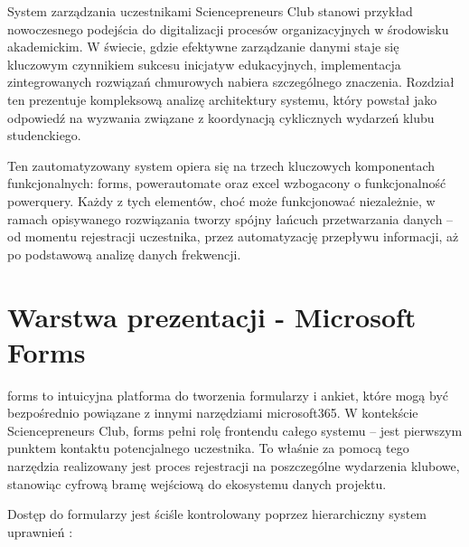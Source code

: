System zarządzania uczestnikami Sciencepreneurs Club stanowi przykład nowoczesnego podejścia do digitalizacji procesów organizacyjnych w środowisku akademickim. W świecie, gdzie efektywne zarządzanie danymi staje się kluczowym czynnikiem sukcesu inicjatyw edukacyjnych, implementacja zintegrowanych rozwiązań chmurowych nabiera szczególnego znaczenia. Rozdział ten prezentuje kompleksową analizę architektury systemu, który powstał jako odpowiedź na wyzwania związane z koordynacją cyklicznych wydarzeń klubu studenckiego.

Ten zautomatyzowany system opiera się na trzech kluczowych komponentach funkcjonalnych: \gls{forms}, \gls{powerautomate} oraz \gls{excel} wzbogacony o funkcjonalność \gls{powerquery}. Każdy z tych elementów, choć może funkcjonować niezależnie, w ramach opisywanego rozwiązania tworzy spójny łańcuch przetwarzania danych – od momentu rejestracji uczestnika, przez automatyzację przepływu informacji, aż po podstawową analizę danych frekwencji.

\section{Warstwa prezentacji - Microsoft Forms}

\gls{forms} to intuicyjna platforma do tworzenia formularzy i ankiet, które mogą być bezpośrednio powiązane z innymi narzędziami \gls{microsoft365}. W kontekście Sciencepreneurs Club, \gls{forms} pełni rolę frontendu całego systemu – jest pierwszym punktem kontaktu potencjalnego uczestnika. To właśnie za pomocą tego narzędzia realizowany jest proces rejestracji na poszczególne wydarzenia klubowe, stanowiąc cyfrową bramę wejściową do ekosystemu danych projektu.

Dostęp do formularzy jest ściśle kontrolowany poprzez hierarchiczny system uprawnień \cite{Microsoft365Groups2025}:

